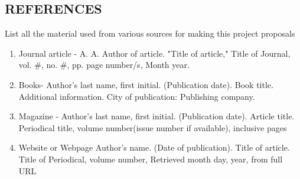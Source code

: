 \documentclass[11pt,a4paper]{article}
\begin{document}
\newpage
\begin{center}
\section{REFERENCES}
{\setlength{\baselineskip}{1.5\baselineskip} }									
\end{center}


List all the material used from various sources for making this project 
proposals 
\begin{enumerate}
\item Journal article - A. A. Author of article. "Title of article," 
Title of Journal, vol. \#, no. \#, pp. page number/s, Month year.

\item Books- Author's last name, first initial. (Publication 
date). Book title. Additional information. City of publication: 
Publishing company.

\item Magazine - Author's last name, first initial. (Publication 
date). Article title. Periodical title, volume number(issue number if 
available), inclusive pages

\item Website or Webpage Author's name. (Date of publication). Title 
of article. Title of Periodical, volume number, Retrieved month day, 
year, from full URL

\end{enumerate}

\end{document}
